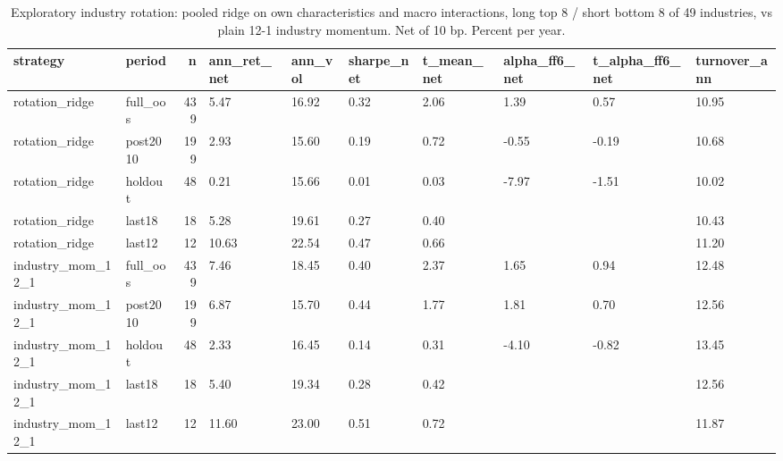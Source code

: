 \begin{table}
\caption{Exploratory industry rotation: pooled ridge on own characteristics and macro interactions, long top 8 / short bottom 8 of 49 industries, vs plain 12-1 industry momentum. Net of 10 bp. Percent per year.}
\label{tab:m6_rotation}
\begin{tabular}{llrlllllll}
\toprule
strategy & period & n & ann\_ret\_net & ann\_vol & sharpe\_net & t\_mean\_net & alpha\_ff6\_net & t\_alpha\_ff6\_net & turnover\_ann \\
\midrule
rotation\_ridge & full\_oos & 439 & 5.47 & 16.92 & 0.32 & 2.06 & 1.39 & 0.57 & 10.95 \\
rotation\_ridge & post2010 & 199 & 2.93 & 15.60 & 0.19 & 0.72 & -0.55 & -0.19 & 10.68 \\
rotation\_ridge & holdout & 48 & 0.21 & 15.66 & 0.01 & 0.03 & -7.97 & -1.51 & 10.02 \\
rotation\_ridge & last18 & 18 & 5.28 & 19.61 & 0.27 & 0.40 &  &  & 10.43 \\
rotation\_ridge & last12 & 12 & 10.63 & 22.54 & 0.47 & 0.66 &  &  & 11.20 \\
industry\_mom\_12\_1 & full\_oos & 439 & 7.46 & 18.45 & 0.40 & 2.37 & 1.65 & 0.94 & 12.48 \\
industry\_mom\_12\_1 & post2010 & 199 & 6.87 & 15.70 & 0.44 & 1.77 & 1.81 & 0.70 & 12.56 \\
industry\_mom\_12\_1 & holdout & 48 & 2.33 & 16.45 & 0.14 & 0.31 & -4.10 & -0.82 & 13.45 \\
industry\_mom\_12\_1 & last18 & 18 & 5.40 & 19.34 & 0.28 & 0.42 &  &  & 12.56 \\
industry\_mom\_12\_1 & last12 & 12 & 11.60 & 23.00 & 0.51 & 0.72 &  &  & 11.87 \\
\bottomrule
\end{tabular}
\end{table}
